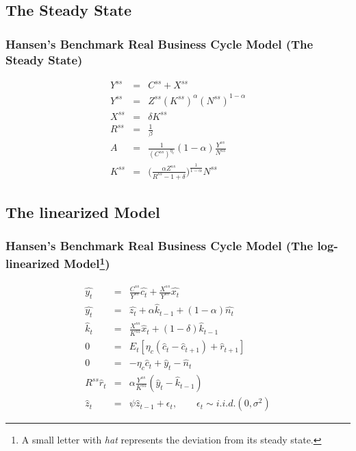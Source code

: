 \documentclass[handout]{beamer}
\begin{document}
\subsection{The Steady State}

\begin{frame}

\frametitle{Hansen's Benchmark Real Business Cycle Model (The Steady
State)}


\begin{eqnarray}
Y^{ss} &=& C^{ss}+X^{ss}\\
Y^{ss} &=& Z^{ss}(K^{ss})^{\alpha} (N^{ss})^{1-\alpha} \label{Eq3.11}\\
X^{ss} &=& \delta K^{ss} \\
R^{ss} &=& \frac{1}{\beta}\\
A &=&
\frac{1}{(C^{ss})^{\eta_{c}}}(1-\alpha)\frac{Y^{ss}}{N^{ss}}\label{Eq3.14}\\
K^{ss} &=& \biggl(\frac{\alpha
Z^{ss}}{R^{ss}-1+\delta}\biggl)^{\frac{1}{1-\alpha}}N^{ss}
\end{eqnarray}

\end{frame}

\subsection{The linearized Model}

\begin{frame}

\frametitle{Hansen's Benchmark Real Business Cycle Model (The
log-linearized Model\footnote{A small letter with \emph{hat}
represents the deviation from its steady state.})}
\begin{eqnarray}
\hat{y_t} &=& \frac{C^{ss}}{Y^{ss}}\hat{c_t} + \frac{X^{ss}}{Y^{ss}} \hat{x_t}\\
\hat{y_t} &=& \hat{z_t}+\alpha \hat{k}_{t-1}+(1-\alpha)\hat{n_t}\\
\hat{k}_t &=& \frac{X^{ss}}{K^{ss}} \hat{x}_t+(1-\delta)\hat{k}_{t-1} \\
0 &=& E_t [\eta_{c}(\hat{c}_t-\hat{c}_{t+1})+\hat{r}_{t+1}] \\
0 &=& -\eta_{c} \hat{c}_t+\hat{y}_t-\hat{n}_t \\
R^{ss}\hat{r}_t &=& \alpha
\frac{Y^{ss}}{K^{ss}}(\hat{y}_t-\hat{k}_{t-1}) \\
\hat{z}_t &=& \psi \hat{z}_{t-1}+\epsilon_t, \qquad \epsilon_t\sim
i.i.d.(0,\sigma^2)
\end{eqnarray}


\end{frame}
\end{document}
